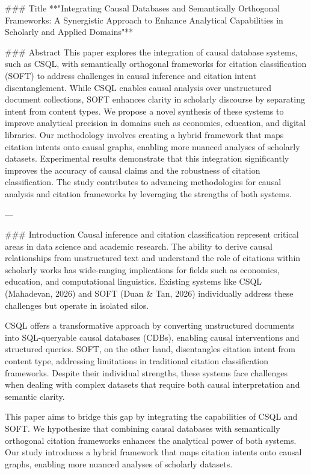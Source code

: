 ### Title
**"Integrating Causal Databases and Semantically Orthogonal Frameworks: A Synergistic Approach to Enhance Analytical Capabilities in Scholarly and Applied Domains"**

### Abstract
This paper explores the integration of causal database systems, such as CSQL, with semantically orthogonal frameworks for citation classification (SOFT) to address challenges in causal inference and citation intent disentanglement. While CSQL enables causal analysis over unstructured document collections, SOFT enhances clarity in scholarly discourse by separating intent from content types. We propose a novel synthesis of these systems to improve analytical precision in domains such as economics, education, and digital libraries. Our methodology involves creating a hybrid framework that maps citation intents onto causal graphs, enabling more nuanced analyses of scholarly datasets. Experimental results demonstrate that this integration significantly improves the accuracy of causal claims and the robustness of citation classification. The study contributes to advancing methodologies for causal analysis and citation frameworks by leveraging the strengths of both systems.

---

### Introduction
Causal inference and citation classification represent critical areas in data science and academic research. The ability to derive causal relationships from unstructured text and understand the role of citations within scholarly works has wide-ranging implications for fields such as economics, education, and computational linguistics. Existing systems like CSQL (Mahadevan, 2026) and SOFT (Duan & Tan, 2026) individually address these challenges but operate in isolated silos.

CSQL offers a transformative approach by converting unstructured documents into SQL-queryable causal databases (CDBs), enabling causal interventions and structured queries. SOFT, on the other hand, disentangles citation intent from content type, addressing limitations in traditional citation classification frameworks. Despite their individual strengths, these systems face challenges when dealing with complex datasets that require both causal interpretation and semantic clarity.

This paper aims to bridge this gap by integrating the capabilities of CSQL and SOFT. We hypothesize that combining causal databases with semantically orthogonal citation frameworks enhances the analytical power of both systems. Our study introduces a hybrid framework that maps citation intents onto causal graphs, enabling more nuanced analyses of scholarly datasets.


